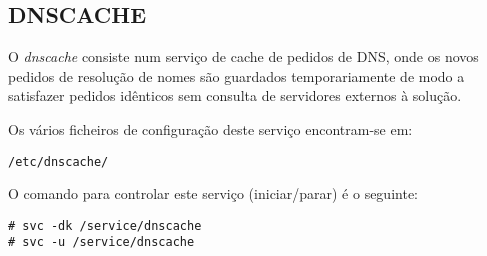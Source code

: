 \subsection{DNSCACHE}

O \emph{dnscache} consiste num serviço de cache de pedidos de DNS, onde
os novos pedidos de resolução de nomes são guardados temporariamente de
modo a satisfazer pedidos idênticos sem consulta de servidores externos 
à solução.

Os vários ficheiros de configuração deste serviço encontram-se em:

\begin{Verbatim}[commandchars=\\\{\}]
/etc/dnscache/
\end{Verbatim}

O comando para controlar este serviço (iniciar/parar) é o seguinte:

\begin{Verbatim}[commandchars=\\\{\}]
# svc -dk /service/dnscache
# svc -u /service/dnscache
\end{Verbatim}

